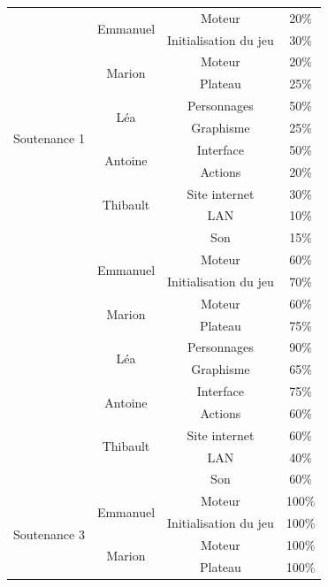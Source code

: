 \documentclass[12pt]{extarticle}
\begin{document}
\begin{table}[!ht]
	\begin{center}
		\begin{tabular}{ | c | c | c | c | }
			\hline
			\multirow{12}{*}{Soutenance 1} & \multirow{2}{*}{Emmanuel} & Moteur & 20\% \\ \cline{3-4}
			&& Initialisation du jeu & 30\% \\ \cline{2-4}
			& \multirow{2}{*}{Marion} & Moteur & 20\% \\ \cline{3-4}
			&& Plateau & 25\% \\ \cline{2-4}
			& \multirow{2}{*}{Léa} & Personnages & 50\% \\ \cline{3-4}
			&& Graphisme & 25\% \\ \cline{2-4}
			& \multirow{2}{*}{Antoine} & Interface & 50\% \\ \cline{3-4}
			&& Actions & 20\% \\ \cline{2-4}
			& \multirow{2}{*}{Thibault} & Site internet & 30\% \\ \cline{3-4}
			&& LAN & 10\% \\ \cline{3-4}
			&& Son & 15\% \\ \hline \hline
			\multirow{12}{*}{Soutenance 2} & \multirow{2}{*}{Emmanuel} & Moteur & 60\% \\ \cline{3-4}
			&& Initialisation du jeu & 70\% \\ \cline{2-4}
			& \multirow{2}{*}{Marion} & Moteur & 60\% \\ \cline{3-4}
			&& Plateau & 75\% \\ \cline{2-4}
			& \multirow{2}{*}{Léa} & Personnages & 90\% \\ \cline{3-4}
			&& Graphisme & 65\% \\ \cline{2-4}
			& \multirow{2}{*}{Antoine} & Interface & 75\% \\ \cline{3-4}
			&& Actions & 60\% \\ \cline{2-4}
			& \multirow{2}{*}{Thibault} & Site internet & 60\% \\ \cline{3-4}
			&& LAN & 40\% \\ \cline{3-4}
			&& Son & 60\% \\ \hline \hline
			\multirow{12}{*}{Soutenance 3} & \multirow{2}{*}{Emmanuel} & Moteur & 100\% \\ \cline{3-4}
			&& Initialisation du jeu & 100\% \\ \cline{2-4}
			& \multirow{2}{*}{Marion} & Moteur & 100\% \\ \cline{3-4}
			&& Plateau & 100\% \\ \cline{2-4}

\end{tabular}
\end{center}
\end{table}
\end{document}
